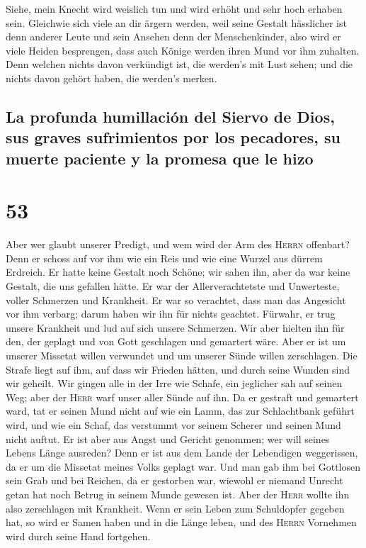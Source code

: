  Siehe, mein Knecht wird weislich tun und wird erhöht und
sehr hoch erhaben sein.  Gleichwie sich viele an dir
ärgern werden, weil seine Gestalt hässlicher ist denn anderer Leute und
sein Ansehen denn der Menschenkinder,  also wird er viele
Heiden besprengen, dass auch Könige werden ihren Mund vor ihm zuhalten.
Denn welchen nichts davon verkündigt ist, die werden's mit Lust sehen;
und die nichts davon gehört haben, die werden's merken.

\hypertarget{la-profunda-humillaciuxf3n-del-siervo-de-dios-sus-graves-sufrimientos-por-los-pecadores-su-muerte-paciente-y-la-promesa-que-le-hizo}{%
\subsection{La profunda humillación del Siervo de Dios, sus graves
sufrimientos por los pecadores, su muerte paciente y la promesa que le
hizo}\label{la-profunda-humillaciuxf3n-del-siervo-de-dios-sus-graves-sufrimientos-por-los-pecadores-su-muerte-paciente-y-la-promesa-que-le-hizo}}

\hypertarget{section-52}{%
\section{53}\label{section-52}}

 Aber wer glaubt unserer Predigt, und wem wird der Arm des
\textsc{Herrn} offenbart?  Denn er schoss auf vor ihm wie
ein Reis und wie eine Wurzel aus dürrem Erdreich. Er hatte keine Gestalt
noch Schöne; wir sahen ihn, aber da war keine Gestalt, die uns gefallen
hätte.  Er war der Allerverachtetste und Unwerteste,
voller Schmerzen und Krankheit. Er war so verachtet, dass man das
Angesicht vor ihm verbarg; darum haben wir ihn für nichts geachtet.
 Fürwahr, er trug unsere Krankheit und lud auf sich unsere
Schmerzen. Wir aber hielten ihn für den, der geplagt und von Gott
geschlagen und gemartert wäre.  Aber er ist um unserer
Missetat willen verwundet und um unserer Sünde willen zerschlagen. Die
Strafe liegt auf ihm, auf dass wir Frieden hätten, und durch seine
Wunden sind wir geheilt.  Wir gingen alle in der Irre wie
Schafe, ein jeglicher sah auf seinen Weg; aber der \textsc{Herr} warf
unser aller Sünde auf ihn.  Da er gestraft und gemartert
ward, tat er seinen Mund nicht auf wie ein Lamm, das zur Schlachtbank
geführt wird, und wie ein Schaf, das verstummt vor seinem Scherer und
seinen Mund nicht auftut.  Er ist aber aus Angst und
Gericht genommen; wer will seines Lebens Länge ausreden? Denn er ist aus
dem Lande der Lebendigen weggerissen, da er um die Missetat meines Volks
geplagt war.  Und man gab ihm bei Gottlosen sein Grab und
bei Reichen, da er gestorben war, wiewohl er niemand Unrecht getan hat
noch Betrug in seinem Munde gewesen ist.  Aber der
\textsc{Herr} wollte ihn also zerschlagen mit Krankheit. Wenn er sein
Leben zum Schuldopfer gegeben hat, so wird er Samen haben und in die
Länge leben, und des \textsc{Herrn} Vornehmen wird durch seine Hand
fortgehen.

